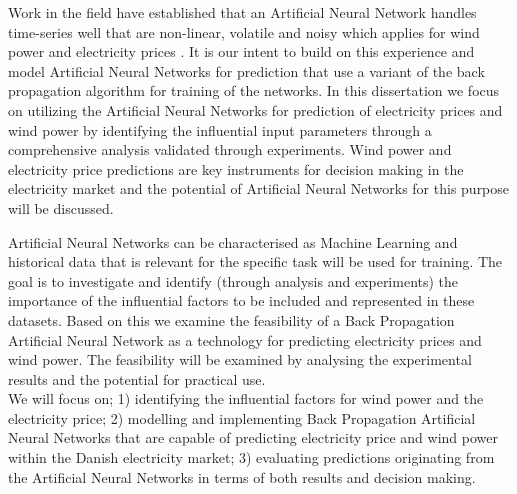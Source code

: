 Work in the field have established that an Artificial Neural Network handles time-series well that are non-linear, volatile and noisy which applies for wind power and electricity prices \cite{stockForecasting,pjmForecast,yamin2004adaptive,windForecastPortugal}. It is our intent to build on this experience and model Artificial Neural Networks for prediction that use a variant of the back propagation algorithm for training of the networks. In this dissertation we focus on utilizing the Artificial Neural Networks for prediction of electricity prices and wind power by identifying the influential input parameters through a comprehensive analysis validated through experiments. Wind power and electricity price predictions are key instruments for decision making in the electricity market\cite{dayAheadImpactOfWindPowerForecasts,21} and the potential of Artificial Neural Networks for this purpose will be discussed.

Artificial Neural Networks can be characterised as Machine Learning\cite{18} and historical data that is relevant for the specific task will be used for training. The goal is to investigate and identify (through analysis and experiments) the importance of the influential factors to be included and represented in these datasets. Based on this we examine the feasibility of a Back Propagation Artificial Neural Network as a technology for predicting electricity prices and wind power. The feasibility will be examined by analysing the experimental results and the potential for practical use.
\\[0.5cm]
We will focus on; 1) identifying the influential factors for wind power and the electricity price; 2) modelling and implementing Back Propagation Artificial Neural Networks that are capable of predicting electricity price and wind power within the Danish electricity market; 3) evaluating predictions originating from the Artificial Neural Networks in terms of both results and decision making.